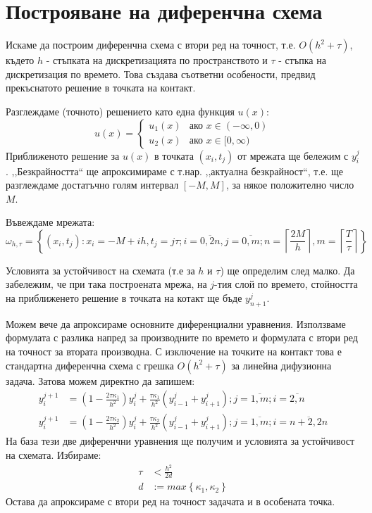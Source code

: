 \section{Построяване на диференчна схема}
Искаме да построим диференчна схема с втори ред на точност, т.е. $O(h^2 + \tau)$, където $h$ - стъпката на дискретизацията по пространството и $\tau$  - стъпка на дискретизация по времето.
Това създава съответни особености, предвид прекъснатото решение в точката на контакт.

\noindent Разглеждаме (точното) решението като една функция $u(x)$:
\begin{equation}
    u(x)=
        \begin{cases}
            u_1(x) & \text{ако } x \in (-\infty, 0)\\
            u_2(x) & \text{ако } x \in [0, \infty)
        \end{cases}
\end{equation}
Приближеното решение за $u(x)$ в точката $(x_i, t_j)$ от мрежата ще бележим с $y_{i}^{j}$. ,,Безкрайността`` ще апроксимираме с т.нар. ,,актуална безкрайност``, т.е. ще разглеждаме достатъчно голям интервал $[-M, M]$, за някое положително число $M$.

\noindent Въвеждаме мрежата:
\begin{equation*}
    \omega_{h, \tau } = \left\{ (x_i, t_j):  x_i = -M + i h, t_j = j \tau; i = \overline{0,2n}, j = \overline{0,m};  n = \left\lceil \frac{2M}{h} \right\rceil, m =\left\lceil \frac{T}{\tau} \right\rceil \right\}
\end{equation*}

\noindent Условията за устойчивост на схемата (т.е за $h$ и $\tau$) ще определим след малко.
Да забележим, че при така построената мрежа, на $j$-тия слой по времето, стойността на приближенето решение в точката на котакт ще бъде $y_{n+1}^j$.

Можем вече да апроксираме основните диференциални уравнения. Използваме формулата с разлика напред за производните по времето и формулата с втори ред на точност за втората производна.
С изключение на точките на контакт това е стандартна диференчна схема с грешка $O(h^2+\tau)$ за линейна дифузионна задача. Затова можем директно да запишем:
\begin{align}
    y_{i}^{j+1} &= \left(1-\frac{2 \tau \kappa_1}{h^2}\right)y_{i}^j + \frac{\tau \kappa_1}{h^2}\left(y_{i-1}^j + y_{i+1}^j\right); j = \overline{1, m}; i  = \overline{2, n} \\
    y_{i}^{j+1} &= \left(1-\frac{2 \tau \kappa_2}{h^2}\right)y_{i}^j + \frac{\tau \kappa_2}{h^2}\left(y_{i-1}^j + y_{i+1}^j\right); j = \overline{1, m}; i  = \overline{n+2, 2n}
\end{align}
На база тези две диференчни уравнения ще получим и условията за устойчивост на схемата. Избираме:
\begin{align*}
    \tau &< \frac{h^2}{2 d}\\
    d &:= max \left\{\kappa_1, \kappa_2 \right\}
\end{align*}
Остава да апроксираме с втори ред на точност задачата и в особената точка.


